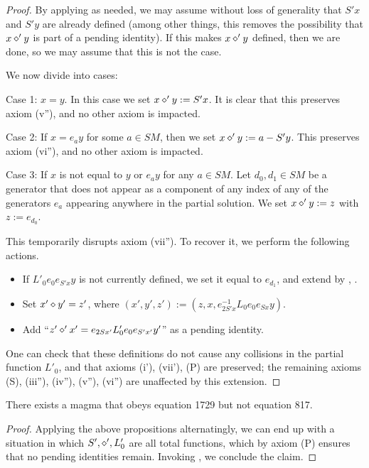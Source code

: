 \begin{proof}  By applying  as needed, we may assume without loss of generality that $S'x$ and $S'y$ are already defined (among other things, this removes the possibility that $x \diamond' y$ is part of a pending identity).  If this makes $x \diamond' y$ defined, then we are done, so we may assume that this is not the case.

We now divide into cases:

Case 1: $x=y$.  In this case we set $x \diamond' y := S'x$.  It is clear that this preserves axiom (v''), and no other axiom is impacted.

Case 2: If $x = e_a y$ for some $a \in SM$, then we set $x \diamond' y := a - S'y$.  This preserves axiom (vi''), and no other axiom is impacted.

Case 3: If $x$ is not equal to $y$ or $e_a y$ for any $a \in SM$.  Let $d_0, d_1 \in SM$ be a generator that does not appear as a component of any index of any of the generators $e_a$ appearing anywhere in the partial solution.  We set $x \diamond' y := z$ with $z := e_{d_0}$.

This temporarily disrupts axiom (vii'').  To recover it, we perform the following actions.
\begin{itemize}
  \item If $L'_0 e_0 e_{S'x} y$ is not currently defined, we set it equal to $e_{d_1}$, and extend by , .
  \item Set $x' \diamond y' = z'$, where $(x',y',z') := (z, x, e_{2S'x}^{-1} L_0 e_0 e_{Sx} y)$.
  \item Add ``$z' \diamond' x' = e_{2Sx'} L'_0 e_0 e_{S'x'} y'$'' as a pending identity.
\end{itemize}

One can check that these definitions do not cause any collisions in the partial function $L'_0$, and that axioms (i'), (vii'), (P) are preserved; the remaining axioms (S), (iii''), (iv''), (v''), (vi'') are unaffected by this extension.
\end{proof}


\begin{theorem}\label{1729_refute_817} There exists a magma that obeys equation 1729 but not equation 817.
\end{theorem}

\begin{proof}
  Applying the above propositions alternatingly, we can end up with a situation in which $S', \diamond', L'_0$ are all total functions, which by axiom (P) ensures that no pending identities remain.  Invoking , we conclude the claim.
\end{proof}
